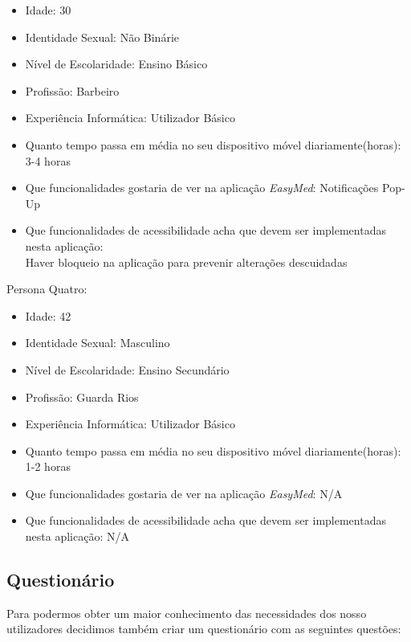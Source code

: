 \documentclass[a4paper]{article}
\begin{document}
\begin{itemize}
    \item Idade: 30
    \item Identidade Sexual: Não Binárie
    \item Nível de Escolaridade: Ensino Básico
    \item Profissão: Barbeiro
    \item Experiência Informática: Utilizador Básico
    \item Quanto tempo passa em média no seu dispositivo móvel diariamente(horas): 3-4 horas
    \item Que funcionalidades gostaria de ver na aplicação \textit{EasyMed}: Notificações Pop-Up
    \item Que funcionalidades de acessibilidade acha que devem ser implementadas nesta aplicação:\\
    Haver bloqueio na aplicação para prevenir alterações descuidadas
\end{itemize}

\begin{center}
Persona Quatro:
\end{center}

\begin{itemize}
    \item Idade: 42 
    \item Identidade Sexual: Masculino
    \item Nível de Escolaridade: Ensino Secundário
    \item Profissão: Guarda Rios
    \item Experiência Informática: Utilizador Básico 
    \item Quanto tempo passa em média no seu dispositivo móvel diariamente(horas): 1-2 horas
    \item Que funcionalidades gostaria de ver na aplicação \textit{EasyMed}: N/A
    \item Que funcionalidades de acessibilidade acha que devem ser implementadas nesta aplicação: N/A
\end{itemize}

\subsection{Questionário}
Para podermos obter um maior conhecimento das necessidades dos nosso utilizadores decidimos também criar um questionário com as seguintes questões:
\cite{gforms_easymed}
\end{document}
